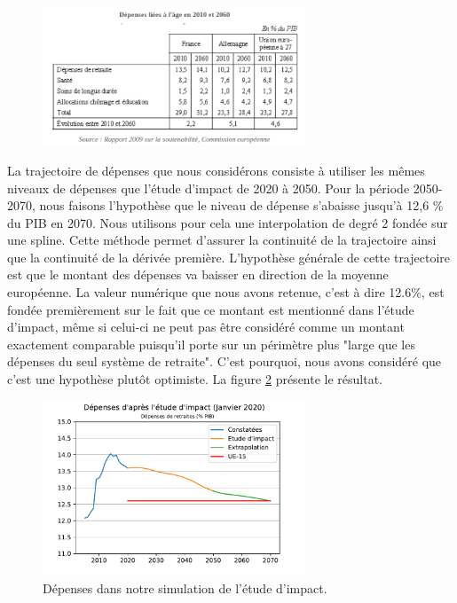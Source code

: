 \documentclass[10pt]{article}
\begin{document}
\begin{figure}
\begin{center}
\includegraphics[width=0.7\textwidth]{Depenses-retraites-2010-2060-France-Allemagne.png}
\end{center}
\caption{}
\label{fig-depenses-France-Allemagne}
\end{figure}

La trajectoire de dépenses que nous considérons consiste à utiliser les mêmes 
niveaux de dépenses que l'étude d'impact de 2020 à 2050. 
Pour la période 2050-2070, nous faisons l'hypothèse que le niveau 
de dépense s'abaisse jusqu'à 12,6 \% du PIB en 2070. 
Nous utilisons pour cela une interpolation de degré 2 fondée sur une spline. 
Cette méthode permet d'assurer la continuité de la trajectoire ainsi que la continuité 
de la dérivée première. 
L'hypothèse générale de cette trajectoire est que le montant des dépenses 
va baisser en direction de la moyenne européenne. 
La valeur numérique que nous avons retenue, c'est à dire 12.6\%, est fondée premièrement 
sur le fait que ce montant est mentionné dans l'étude d'impact, même si celui-ci ne peut pas 
être considéré comme un montant exactement comparable puisqu'il porte 
sur un périmètre plus "large que les dépenses du seul système de retraite". 
C'est pourquoi, nous avons considéré que c'est une hypothèse plutôt optimiste. 
La figure \ref{fig-dépenses-simulation} présente le résultat. 

\begin{figure}
\begin{center}
\includegraphics[width=0.7\textwidth]{Simulation-Depenses.pdf}
\end{center}
\caption{Dépenses dans notre simulation de l'étude d'impact.}
\label{fig-dépenses-simulation}
\end{figure}
\end{document}
